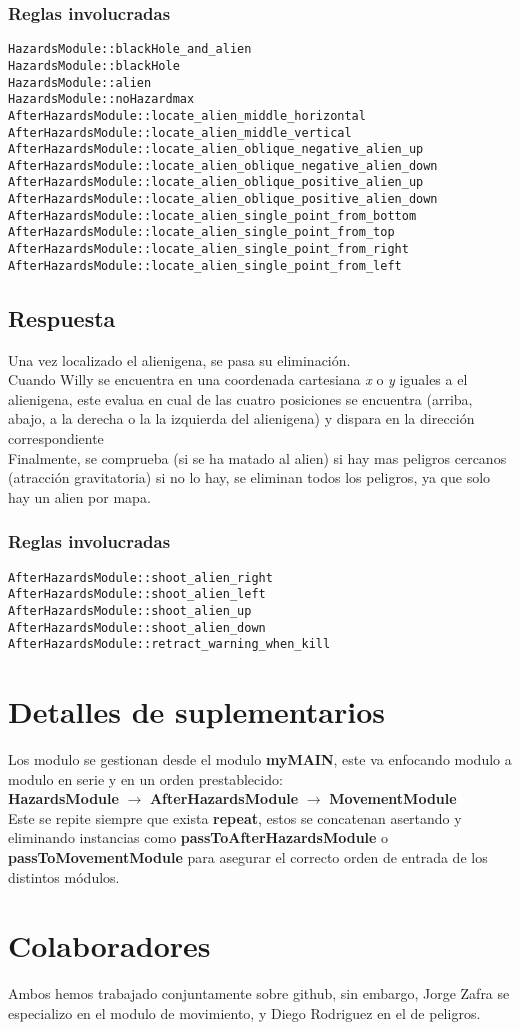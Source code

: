 \documentclass[a4paper,10pt]{article}
\begin{document}
\subsubsection{Reglas involucradas}
\footnotesize
\begin{lstlisting}
HazardsModule::blackHole_and_alien
HazardsModule::blackHole
HazardsModule::alien
HazardsModule::noHazardmax
AfterHazardsModule::locate_alien_middle_horizontal
AfterHazardsModule::locate_alien_middle_vertical
AfterHazardsModule::locate_alien_oblique_negative_alien_up
AfterHazardsModule::locate_alien_oblique_negative_alien_down
AfterHazardsModule::locate_alien_oblique_positive_alien_up
AfterHazardsModule::locate_alien_oblique_positive_alien_down
AfterHazardsModule::locate_alien_single_point_from_bottom
AfterHazardsModule::locate_alien_single_point_from_top
AfterHazardsModule::locate_alien_single_point_from_right
AfterHazardsModule::locate_alien_single_point_from_left
\end{lstlisting}
\normalsize

\subsection{Respuesta}
Una vez localizado el alienigena, se pasa su eliminación.
\vspace{0.5 cm}\\
Cuando Willy se encuentra en una coordenada cartesiana {\it x} o {\it y} iguales a el alienigena, este evalua en cual de las cuatro posiciones se encuentra (arriba, abajo, a la derecha o la la izquierda del alienigena) y dispara en la dirección correspondiente
\vspace{0.5 cm}\\
Finalmente, se comprueba (si se ha matado al alien) si hay mas peligros cercanos (atracción gravitatoria) si no lo hay, se eliminan todos los peligros, ya que solo hay un alien por mapa.
\subsubsection{Reglas involucradas}
\footnotesize
\begin{lstlisting}
AfterHazardsModule::shoot_alien_right
AfterHazardsModule::shoot_alien_left
AfterHazardsModule::shoot_alien_up
AfterHazardsModule::shoot_alien_down
AfterHazardsModule::retract_warning_when_kill
\end{lstlisting}
\normalsize
\pagebreak


\section{Detalles de suplementarios}
Los modulo se gestionan desde el modulo {\bf myMAIN}, este va enfocando modulo a modulo en serie y en un orden prestablecido:
\\{\bf HazardsModule} $\rightarrow$ {\bf AfterHazardsModule} $\rightarrow$ {\bf MovementModule}\\
Este se repite siempre que exista {\bf repeat}, estos se concatenan asertando y eliminando instancias como {\bf passToAfterHazardsModule} o {\bf passToMovementModule} para asegurar el correcto orden de entrada de los distintos módulos.

\section{Colaboradores}
Ambos hemos trabajado conjuntamente sobre github, sin embargo, Jorge Zafra se especializo en el modulo de movimiento, y Diego Rodriguez en el de peligros.
\end{document}
